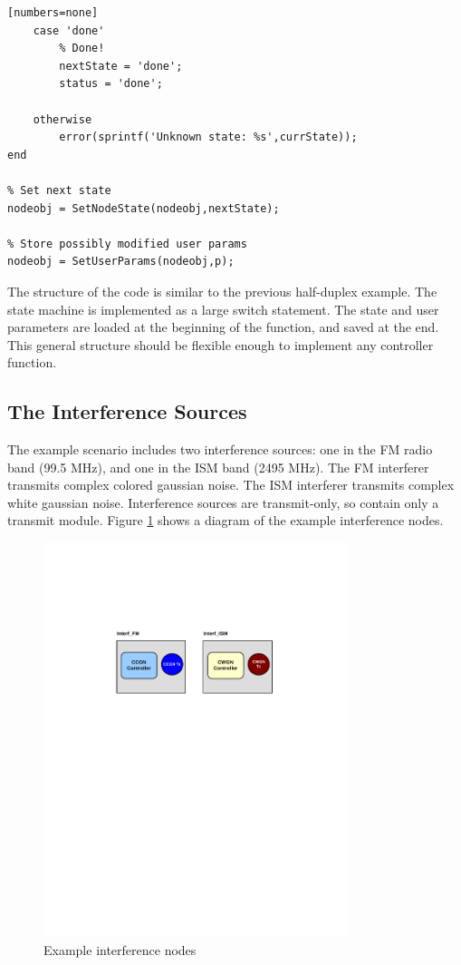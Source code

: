 \begin{lstlisting}[name=fdController, firstnumber=24][numbers=none]
    case 'done'
        % Done!
        nextState = 'done';
        status = 'done';

    otherwise
        error(sprintf('Unknown state: %s',currState));
end

% Set next state
nodeobj = SetNodeState(nodeobj,nextState);

% Store possibly modified user params
nodeobj = SetUserParams(nodeobj,p);
\end{lstlisting}

The structure of the code is similar to the previous half-duplex
example.  The state machine is implemented as a large switch
statement.  The state and user parameters are loaded at the
beginning of the function, and saved at the end.  This general
structure should be flexible enough to implement any controller
function.

\subsection{The Interference Sources}
\label{sec:interference_source}
The example scenario includes two interference sources: one in the
FM radio band (99.5 MHz), and one in the ISM band (2495 MHz). The FM
interferer transmits complex colored gaussian noise. The ISM
interferer transmits complex white gaussian noise. Interference
sources are transmit-only, so contain only a transmit module. Figure
\ref{fig:interfNodes} shows a diagram of the example interference
nodes.

\begin{figure}[h]
\centering
\includegraphics[width=3.5in]{figs/Interf_Example}
\caption{Example interference nodes} \label{fig:interfNodes}
\end{figure}

